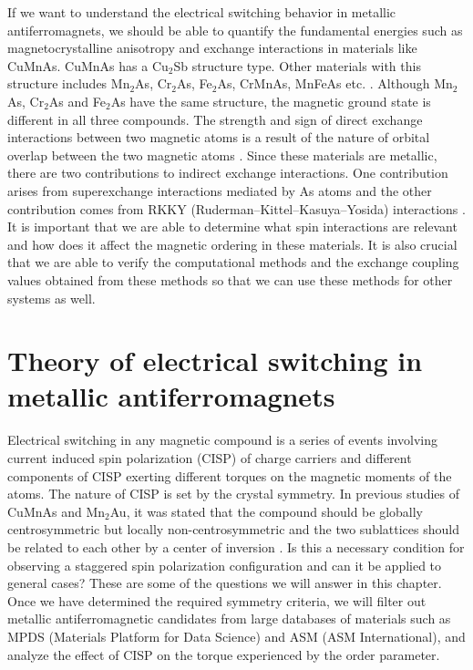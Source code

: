 \documentclass[10pt,doublespacing,edeposit]{uiucthesis2020}
\begin{document}
\begin{mainmatter}
If we want to understand the electrical switching behavior in metallic antiferromagnets, we should be able to quantify the fundamental energies such as magnetocrystalline anisotropy and exchange interactions in materials like CuMnAs. CuMnAs has a Cu$_2$Sb structure type. Other materials with this structure includes Mn$_2$As, Cr$_2$As, Fe$_2$As, CrMnAs, MnFeAs etc. \cite{Lutz-Kappelman2018,Zhang2013,Zhang2015}. Although Mn$_2$As, Cr$_2$As and Fe$_2$As have the same structure, the magnetic ground state is different in all three compounds. The strength and sign of direct exchange interactions between two magnetic atoms is a result of the nature of orbital overlap between the two magnetic atoms \cite{Zhang2013}. Since these materials are metallic, there are two contributions to indirect exchange interactions. One contribution arises from superexchange interactions mediated by As atoms and the other contribution comes from RKKY (Ruderman–Kittel–Kasuya–Yosida) interactions \cite{Zhang2015}. It is important that we are able to determine what spin interactions are relevant and how does it affect the magnetic ordering in these materials. It is also crucial that we are able to verify the computational methods and the exchange coupling values obtained from these methods so that we can use these methods for other systems as well.

\chapter{Theory of electrical switching in metallic antiferromagnets}

Electrical switching in any magnetic compound is a series of events involving current induced spin polarization (CISP) of charge carriers and different components of CISP exerting different torques on the magnetic moments of the atoms. The nature of CISP is set by the crystal symmetry. In previous studies of CuMnAs and Mn$_2$Au, it was stated that the compound should be globally centrosymmetric but locally non-centrosymmetric and the two sublattices should be related to each other by a center of inversion \cite{Zelezny2014,Zelezny2017,Wadley2016}. Is this a necessary condition for observing a staggered spin polarization configuration and can it be applied to general cases? These are some of the questions we will answer in this chapter. Once we have determined the required symmetry criteria, we will filter out metallic antiferromagnetic candidates from large databases of materials such as MPDS (Materials Platform for Data Science) and ASM (ASM International), and analyze the effect of CISP on the torque experienced by the order parameter.


\end{mainmatter}
\end{document}
